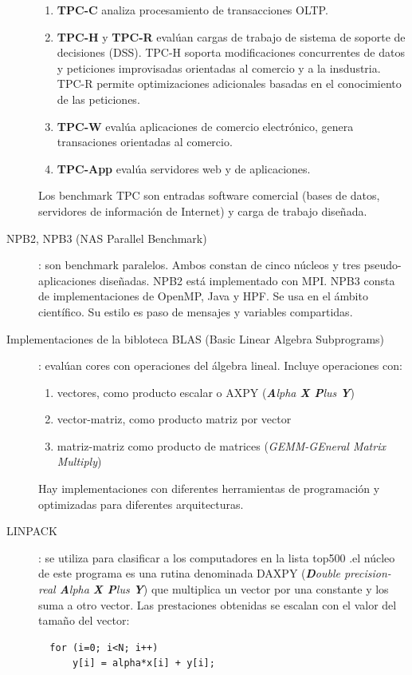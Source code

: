 \documentclass[10pt,a4paper,spanish]{report}
\begin{document}
\begin{description}
  \begin{enumerate}[\color{azul}{\bf $\heartsuit$}]
    \item \textcolor[rgb]{0.2,0.4,0.8}{\textbf{TPC-C}} analiza procesamiento de transacciones OLTP.
    \item \textcolor[rgb]{0.2,0.4,0.8}{\textbf{TPC-H}} y \textcolor[rgb]{0.2,0.4,0.8}{\textbf{TPC-R}} evalúan cargas de trabajo de sistema de soporte de decisiones (DSS). TPC-H soporta modificaciones concurrentes de datos y peticiones improvisadas orientadas al comercio y a la insdustria. TPC-R permite optimizaciones adicionales basadas en el conocimiento de las peticiones.
    \item \textcolor[rgb]{0.2,0.4,0.8}{\textbf{TPC-W}} evalúa aplicaciones de comercio electrónico, genera transaciones orientadas al comercio.
    \item \textcolor[rgb]{0.2,0.4,0.8}{\textbf{TPC-App}} evalúa servidores web y de aplicaciones.
  \end{enumerate}
  Los benchmark TPC son entradas software comercial (bases de datos, servidores de información de Internet) y carga de trabajo diseñada.
  \item[NPB2, NPB3 (NAS Parallel Benchmark)]: son benchmark paralelos. Ambos constan de cinco núcleos y tres pseudo-aplicaciones diseñadas. NPB2 está implementado con MPI. NPB3 consta de implementaciones de OpenMP, Java y HPF. Se usa en el ámbito científico. Su estilo es paso de mensajes y variables compartidas.
  \item[Implementaciones de la bibloteca BLAS (Basic Linear Algebra Subprograms)]: evalúan cores con operaciones del álgebra lineal. Incluye operaciones con:
  \begin{enumerate}[\color{azul}{\bf $\heartsuit$}]
    \item vectores, como producto escalar o AXPY (\textit{\textcolor[rgb]{0.2,0.4,0.8}{\textbf{A}lpha \textbf{X P}lus \textbf{Y}}})
    \item vector-matriz, como producto matriz por vector
    \item matriz-matriz como producto de matrices (\textit{\textcolor[rgb]{0.2,0.4,0.8}{GEMM-GEneral Matrix Multiply}})
  \end{enumerate}
  Hay implementaciones con diferentes herramientas de programación y optimizadas para diferentes arquitecturas.
  \item[LINPACK]: se utiliza para clasificar a los computadores en la lista top500 .el núcleo de este programa es una rutina denominada DAXPY (\textit{\textcolor[rgb]{0.2,0.4,0.8}{\textbf{D}ouble precision-real \textbf{A}lpha \textbf{X P}lus \textbf{Y}}}) que multiplica un vector por una constante y los suma a otro vector. Las prestaciones obtenidas se escalan con el valor del tamaño del vector:
  \begin{verbatim}
  for (i=0; i<N; i++)
      y[i] = alpha*x[i] + y[i];
  \end{verbatim}
\end{description}
\end{document}
